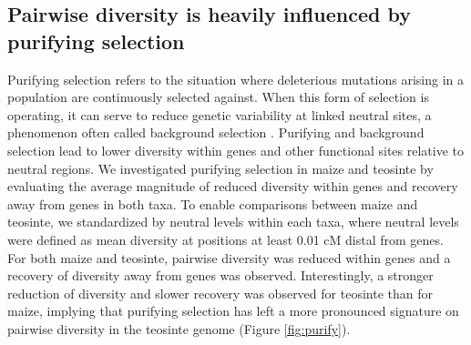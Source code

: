 \documentclass{pnastwo}
\begin{document}
\begin{article}
\subsection{Pairwise diversity is heavily influenced by purifying selection}

Purifying selection refers to the situation where deleterious mutations arising in a population are continuously selected against.
When this form of selection is operating, it can serve to reduce genetic variability at linked neutral sites, a phenomenon often called background selection \cite{charlesworth1993}. Purifying and background selection lead to lower diversity within genes and other functional sites relative to neutral regions.
We investigated purifying selection in maize and teosinte by evaluating the average magnitude of reduced diversity within genes and recovery away from genes in both taxa.
To enable comparisons between maize and teosinte, we standardized by neutral levels within each taxa, where neutral levels were defined as mean diversity at positions at least 0.01 cM distal from genes. For both maize and teosinte, pairwise diversity was reduced within genes and a recovery of diversity away from genes was observed. Interestingly, a stronger reduction of diversity and slower recovery was observed for teosinte than for maize, implying that purifying selection has left a more pronounced signature on pairwise diversity in the teosinte genome (Figure \ref{fig:purify}).




\end{article}
\end{document}
